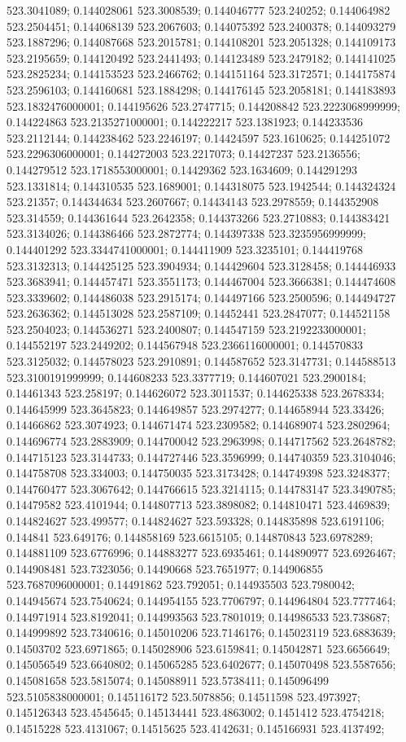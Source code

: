 523.3041089; 0.144028061 523.3008539; 0.144046777 523.240252; 0.144064982 523.2504451; 0.144068139 523.2067603; 0.144075392 523.2400378; 0.144093279 523.1887296; 0.144087668 523.2015781; 0.144108201 523.2051328; 0.144109173 523.2195659; 0.144120492 523.2441493; 0.144123489 523.2479182; 0.144141025 523.2825234; 0.144153523 523.2466762; 0.144151164 523.3172571; 0.144175874 523.2596103; 0.144160681 523.1884298; 0.144176145 523.2058181; 0.144183893 523.1832476000001; 0.144195626 523.2747715; 0.144208842 523.2223068999999; 0.144224863 523.2135271000001; 0.144222217 523.1381923; 0.144233536 523.2112144; 0.144238462 523.2246197; 0.14424597 523.1610625; 0.144251072 523.2296306000001; 0.144272003 523.2217073; 0.14427237 523.2136556; 0.144279512 523.1718553000001; 0.14429362 523.1634609; 0.144291293 523.1331814; 0.144310535 523.1689001; 0.144318075 523.1942544; 0.144324324 523.21357; 0.144344634 523.2607667; 0.14434143 523.2978559; 0.144352908 523.314559; 0.144361644 523.2642358; 0.144373266 523.2710883; 0.144383421 523.3134026; 0.144386466 523.2872774; 0.144397338 523.3235956999999; 0.144401292 523.3344741000001; 0.144411909 523.3235101; 0.144419768 523.3132313; 0.144425125 523.3904934; 0.144429604 523.3128458; 0.144446933 523.3683941; 0.144457471 523.3551173; 0.144467004 523.3666381; 0.144474608 523.3339602; 0.144486038 523.2915174; 0.144497166 523.2500596; 0.144494727 523.2636362; 0.144513028 523.2587109; 0.14452441 523.2847077; 0.144521158 523.2504023; 0.144536271 523.2400807; 0.144547159 523.2192233000001; 0.144552197 523.2449202; 0.144567948 523.2366116000001; 0.144570833 523.3125032; 0.144578023 523.2910891; 0.144587652 523.3147731; 0.144588513 523.3100191999999; 0.144608233 523.3377719; 0.144607021 523.2900184; 0.14461343 523.258197; 0.144626072 523.3011537; 0.144625338 523.2678334; 0.144645999 523.3645823; 0.144649857 523.2974277; 0.144658944 523.33426; 0.14466862 523.3074923; 0.144671474 523.2309582; 0.144689074 523.2802964; 0.144696774 523.2883909; 0.144700042 523.2963998; 0.144717562 523.2648782; 0.144715123 523.3144733; 0.144727446 523.3596999; 0.144740359 523.3104046; 0.144758708 523.334003; 0.144750035 523.3173428; 0.144749398 523.3248377; 0.144760477 523.3067642; 0.144766615 523.3214115; 0.144783147 523.3490785; 0.14479582 523.4101944; 0.144807713 523.3898082; 0.144810471 523.4469839; 0.144824627 523.499577; 0.144824627 523.593328; 0.144835898 523.6191106; 0.144841 523.649176; 0.144858169 523.6615105; 0.144870843 523.6978289; 0.144881109 523.6776996; 0.144883277 523.6935461; 0.144890977 523.6926467; 0.144908481 523.7323056; 0.14490668 523.7651977; 0.144906855 523.7687096000001; 0.14491862 523.792051; 0.144935503 523.7980042; 0.144945674 523.7540624; 0.144954155 523.7706797; 0.144964804 523.7777464; 0.144971914 523.8192041; 0.144993563 523.7801019; 0.144986533 523.738687; 0.144999892 523.7340616; 0.145010206 523.7146176; 0.145023119 523.6883639; 0.14503702 523.6971865; 0.145028906 523.6159841; 0.145042871 523.6656649; 0.145056549 523.6640802; 0.145065285 523.6402677; 0.145070498 523.5587656; 0.145081658 523.5815074; 0.145088911 523.5738411; 0.145096499 523.5105838000001; 0.145116172 523.5078856; 0.14511598 523.4973927; 0.145126343 523.4545645; 0.145134441 523.4863002; 0.1451412 523.4754218; 0.14515228 523.4131067; 0.14515625 523.4142631; 0.145166931 523.4137492; 